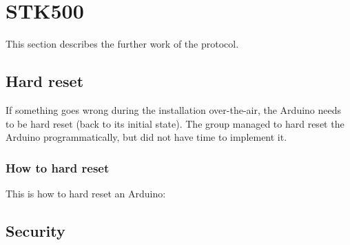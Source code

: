 \section{STK500}
This section describes the further work of the protocol.

	\subsection{Hard reset}
	If something goes wrong during the installation over-the-air, the Arduino needs to be hard reset (back to its initial state).
	The group managed to hard reset the Arduino programmatically, but did not have time to implement it.

		\subsubsection{How to hard reset}
		This is how to hard reset an Arduino:
		
	\subsection{Security}